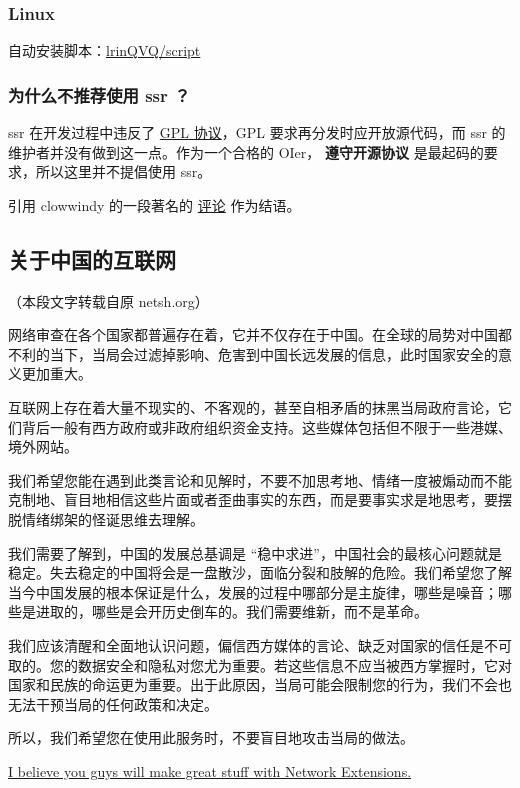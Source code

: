 \subsubsection{Linux}

自动安装脚本：\href{https://github.com/lrinQVQ/script}{lrinQVQ/script}

\subsubsection{为什么不推荐使用 ssr ？}

ssr 在开发过程中违反了 \href{https://zh.wikipedia.org/wiki/GNU%E9%80%9A%E7%94%A8%E5%85%AC%E5%85%B1%E8%AE%B8%E5%8F%AF%E8%AF%81}{GPL 协议}，GPL 要求再分发时应开放源代码，而 ssr 的维护者并没有做到这一点。作为一个合格的 OIer， \textbf{遵守开源协议} 是最起码的要求，所以这里并不提倡使用 ssr。

引用 clowwindy 的一段著名的 \href{https://github.com/shadowsocks/shadowsocks-windows/issues/293#issuecomment-132253168}{评论} 作为结语。

\subsection{关于中国的互联网}

（本段文字转载自原 netsh.org）

网络审查在各个国家都普遍存在着，它并不仅存在于中国。在全球的局势对中国都不利的当下，当局会过滤掉影响、危害到中国长远发展的信息，此时国家安全的意义更加重大。

互联网上存在着大量不现实的、不客观的，甚至自相矛盾的抹黑当局政府言论，它们背后一般有西方政府或非政府组织资金支持。这些媒体包括但不限于一些港媒、境外网站。

我们希望您能在遇到此类言论和见解时，不要不加思考地、情绪一度被煽动而不能克制地、盲目地相信这些片面或者歪曲事实的东西，而是要事实求是地思考，要摆脱情绪绑架的怪诞思维去理解。

我们需要了解到，中国的发展总基调是 “稳中求进”，中国社会的最核心问题就是稳定。失去稳定的中国将会是一盘散沙，面临分裂和肢解的危险。我们希望您了解当今中国发展的根本保证是什么，发展的过程中哪部分是主旋律，哪些是噪音；哪些是进取的，哪些是会开历史倒车的。我们需要维新，而不是革命。

我们应该清醒和全面地认识问题，偏信西方媒体的言论、缺乏对国家的信任是不可取的。您的数据安全和隐私对您尤为重要。若这些信息不应当被西方掌握时，它对国家和民族的命运更为重要。出于此原因，当局可能会限制您的行为，我们不会也无法干预当局的任何政策和决定。

所以，我们希望您在使用此服务时，不要盲目地攻击当局的做法。

\hr

\begin{QUOTE}{}{}
\href{https://github.com/shadowsocks/shadowsocks-iOS/issues/124#issuecomment-133630294}{I believe you guys will make great stuff with Network Extensions.}
\end{QUOTE}
